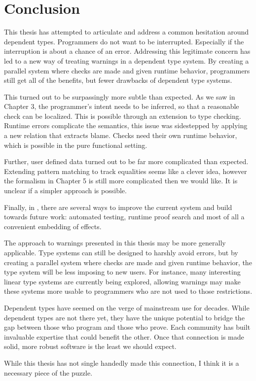 \chapter{Conclusion}
\label{chapter:Conclusion}
\thispagestyle{myheadings}

This thesis has attempted to articulate and address a common hesitation around dependent types.
Programmers do not want to be interrupted.
Especially if the interruption is about a chance of an error.
Addressing this legitimate concern has led to a new way of treating warnings in a dependent type system.
By creating a parallel system where checks are made and given runtime behavior, programmers still get all of the benefits, but fewer drawbacks of dependent type systems.

This turned out to be surpassingly more subtle than expected.
As we saw in Chapter 3, the programmer's intent needs to be inferred, so that a reasonable check can be localized.
This is possible through an extension to \bidir{} type checking.
Runtime errors complicate the semantics, this issue was sidestepped by applying a new relation that extracts blame.
Checks need their own runtime behavior, which is possible in the pure functional setting.

Further, user defined data turned out to be far more complicated than expected.
Extending pattern matching to track equalities seems like a clever idea, however the formalism in Chapter 5 is still more complicated then we would like.
It is unclear if a simpler approach is possible.

Finally, in , there are several ways to improve the current system and build towards future work: automated testing, runtime proof search and most of all a convenient embedding of effects.

The approach to warnings presented in this thesis may be more generally applicable.
Type systems can still be designed to harshly avoid errors, but by creating a parallel system where checks are made and given runtime behavior, the type system will be less imposing to new users.
For instance, many interesting linear type systems are currently being explored, allowing warnings may make these systems more usable to programmers who are not used to those restrictions.

Dependent types have seemed on the verge of mainstream use for decades.
While dependent types are not there yet, they have the unique potential to bridge the gap between those who program and those who prove.
Each community has built invaluable expertise that could benefit the other.
Once that connection is made solid, more robust software is the least we should expect.

While this thesis has not single handedly made this connection, I think it is a necessary piece of the puzzle.

